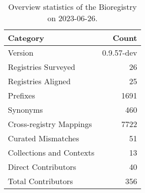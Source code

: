 \begin{table}
\caption{Overview statistics of the Bioregistry on 2023-06-26.}
\label{tab:bioregistry-summary}
\begin{tabular}{lr}
\toprule
Category & Count \\
\midrule
Version & 0.9.57-dev \\
Registries Surveyed & 26 \\
Registries Aligned & 25 \\
Prefixes & 1691 \\
Synonyms & 460 \\
Cross-registry Mappings & 7722 \\
Curated Mismatches & 51 \\
Collections and Contexts & 13 \\
Direct Contributors & 40 \\
Total Contributors & 356 \\
\bottomrule
\end{tabular}
\end{table}
